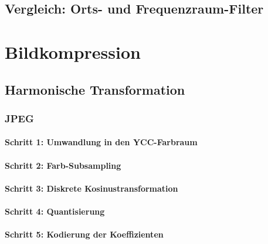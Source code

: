 \documentclass[a4paper, 11pt, accentcolor = tud3b]{tudreport}
\begin{document}
			\subsection{Vergleich: Orts- und Frequenzraum-Filter} %

		\section{Bildkompression} %

			\subsection{Harmonische Transformation} %

				\subsubsection{JPEG} %

					\paragraph{Schritt 1: Umwandlung in den YCC-Farbraum} %

					\paragraph{Schritt 2: Farb-Subsampling} %

					\paragraph{Schritt 3: Diskrete Kosinustransformation} %

					\paragraph{Schritt 4: Quantisierung} %

					\paragraph{Schritt 5: Kodierung der Koeffizienten} %
\end{document}
